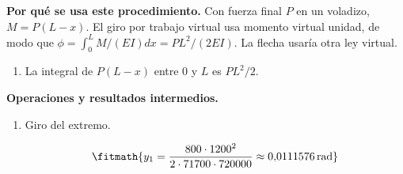 \noindent\textbf{Por qué se usa este procedimiento.} Con fuerza final $P$ en un voladizo, $M=P(L-x)$. El giro por trabajo virtual usa momento virtual unidad, de modo que $\phi=\int_0^L M/(EI)dx=PL^2/(2EI)$. La flecha usaría otra ley virtual.

\begin{enumerate}

\item La integral de $P(L - x)$ entre 0 y $L$ es $P L^2/2$.

\end{enumerate}

\noindent\textbf{Operaciones y resultados intermedios.}

\begin{enumerate}

\item Giro del extremo.

\[\fitmath{y_{1}=\frac{800\cdot {1200}^{2}}{2\cdot 71700\cdot 720000}\approx 0{,}0111576\,\mathrm{rad}}\]

\end{enumerate}

